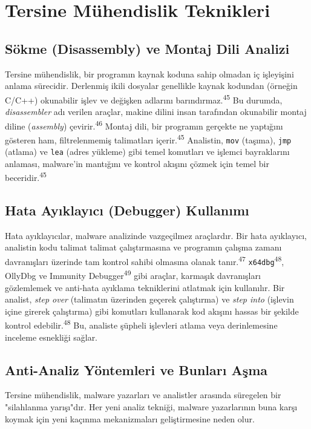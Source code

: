 \section{Tersine Mühendislik Teknikleri}

\subsection{Sökme (Disassembly) ve Montaj Dili Analizi}

Tersine mühendislik, bir programın kaynak koduna sahip olmadan iç işleyişini anlama sürecidir. Derlenmiş ikili dosyalar genellikle kaynak kodundan (örneğin C/C++) okunabilir işlev ve değişken adlarını barındırmaz.\textsuperscript{45} Bu durumda, \textit{disassembler} adı verilen araçlar, makine dilini insan tarafından okunabilir montaj diline (\textit{assembly}) çevirir.\textsuperscript{46} Montaj dili, bir programın gerçekte ne yaptığını gösteren ham, filtrelenmemiş talimatları içerir.\textsuperscript{45} Analistin, \texttt{mov} (taşıma), \texttt{jmp} (atlama) ve \texttt{lea} (adres yükleme) gibi temel komutları ve işlemci bayraklarını anlaması, malware'in mantığını ve kontrol akışını çözmek için temel bir beceridir.\textsuperscript{45}

\subsection{Hata Ayıklayıcı (Debugger) Kullanımı}

Hata ayıklayıcılar, malware analizinde vazgeçilmez araçlardır. Bir hata ayıklayıcı, analistin kodu talimat talimat çalıştırmasına ve programın çalışma zamanı davranışları üzerinde tam kontrol sahibi olmasına olanak tanır.\textsuperscript{47} \texttt{x64dbg}\textsuperscript{48}, OllyDbg ve Immunity Debugger\textsuperscript{49} gibi araçlar, karmaşık davranışları gözlemlemek ve anti-hata ayıklama tekniklerini atlatmak için kullanılır. Bir analist, \textit{step over} (talimatın üzerinden geçerek çalıştırma) ve \textit{step into} (işlevin içine girerek çalıştırma) gibi komutları kullanarak kod akışını hassas bir şekilde kontrol edebilir.\textsuperscript{48} Bu, analiste şüpheli işlevleri atlama veya derinlemesine inceleme esnekliği sağlar.

\subsection{Anti-Analiz Yöntemleri ve Bunları Aşma}

Tersine mühendislik, malware yazarları ve analistler arasında süregelen bir "silahlanma yarışı"dır. Her yeni analiz tekniği, malware yazarlarının buna karşı koymak için yeni kaçınma mekanizmaları geliştirmesine neden olur.

